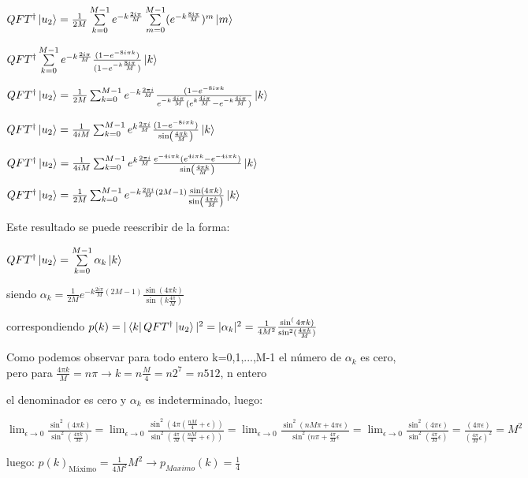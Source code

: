$QFT^\dagger \ket{u_2} = \frac{1}{2M} \sum\limits_{k=0}^{M-1} e^{-k \frac{2 i \pi}{M}} \sum\limits_{m=0}^{M-1} (e^{-k \frac{8 i \pi}{M}})^m \ket{m}$

$QFT^\dagger \sum\limits_{k=0}^{M-1} e^{-k \frac{2 i \pi}{M}} \frac{(1-e^{-8 i \pi k})}{(1 - e^{-k \frac{8 i \pi}{M}})} \ket{k}$

$QFT^\dagger \ket{u_2} = \frac{1}{2M} \sum_{k=0}^{M-1} e^{-k \frac{2 \pi i}{M}} \frac{(1 - e^{-8 i \pi k}}{e^{-k \frac{4 i \pi}{M}} (e^{k \frac{4 i \pi}{M}} - e^{-k \frac{4 i \pi}{M}})} \ket{k}$

$QFT^\dagger \ket{u_2} = \frac{1}{4 i M} \sum_{k=0}^{M-1} e^{k \frac{2 \pi i}{M}} \frac{(1 - e^{-8 i \pi k})}{\sin(\frac{4\pi k}{M})} \ket{k}$

$QFT^\dagger \ket{u_2} = \frac{1}{4 i M} \sum_{k=0}^{M-1} e^{k \frac{2 \pi i}{M}} \frac{e^{-4 i \pi k} (e^{4 i \pi k} - e^{-4 i \pi k})}{\sin(\frac{4\pi k}{M})} \ket{k}$

$QFT^\dagger \ket{u_2} = \frac{1}{2M} \sum_{k=0}^{M-1} e^{-k \frac{2 \pi i}{M} (2M-1)} \frac{\sin(4\pi k)}{\sin(\frac{4\pi k}{M})} \ket{k}$

Este resultado se puede reescribir de la forma:

$QFT^\dagger \ket{u_2} = \sum\limits_{k=0}^{M-1} \alpha_k \ket{k}$

siendo $\alpha_k = \frac{1}{2M} e^{-k \frac{2 i \pi}{M} (2M-1)} \frac{\sin(4 \pi k)}{\sin(k \frac{4 \pi}{M})}$

correspondiendo $p(k) = |\bra{k} QFT^\dagger \ket{u_2}|^2 = |\alpha_k|^2 = \frac{1}{4M^2} \frac{\sin^(4\pi k)}{\sin^2(\frac{4 \pi k}{M})}$

Como podemos observar para todo entero k=0,1,...,M-1 el número de $\alpha_k$ es cero, pero para $\frac{4 \pi k}{M} = n \pi \rightarrow k = n \frac{M}{4} = n 2^7 = n 512$, n entero

el denominador es cero y $\alpha_k$ es indeterminado, luego:

$\lim_{\epsilon \to 0} \frac{\sin^2(4 \pi k)}{\sin^2(\frac{4\pi k}{M})} = \lim_{\epsilon \to 0} \frac{\sin^2(4 \pi (\frac{n M}{4} + \epsilon))}{\sin^2(\frac{4\pi}{M} (\frac{n M}{4} + \epsilon))} = \lim_{\epsilon \to 0} \frac{\sin^2(n M \pi + 4 \pi \epsilon)}{\sin^2(n \pi + \frac{4\pi}{M} \epsilon} = \lim_{\epsilon \to 0} \frac{\sin^2(4 \pi \epsilon)}{\sin^2(\frac{4 \pi}{M} \epsilon)} = \frac{(4 \pi \epsilon)}{(\frac{4 \pi}{M} \epsilon)^2} = M^2$

luego: $p(k)_{\text{Máximo}} = \frac{1}{4M^2} M^2 \rightarrow p_{Maximo}(k) = \frac{1}{4}$

